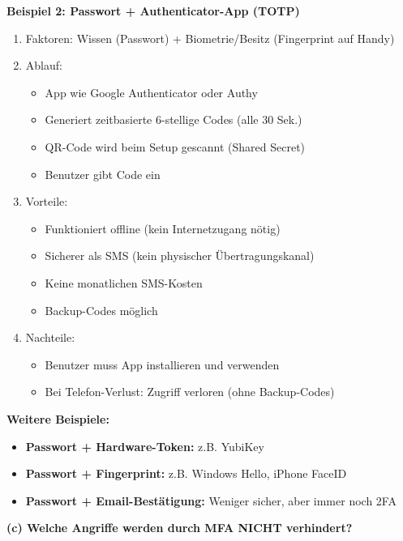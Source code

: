 \documentclass[12pt,a4paper]{article}
\begin{document}
\begin{tcolorbox}[colback=solutionbg, colframe=black!30]

\textbf{Beispiel 2: Passwort + Authenticator-App (TOTP)}
\begin{enumerate}[1.]
    \item Faktoren: Wissen (Passwort) + Biometrie/Besitz (Fingerprint auf Handy)
    \item Ablauf:
    \begin{itemize}
        \item App wie Google Authenticator oder Authy
        \item Generiert zeitbasierte 6-stellige Codes (alle 30 Sek.)
        \item QR-Code wird beim Setup gescannt (Shared Secret)
        \item Benutzer gibt Code ein
    \end{itemize}
    \item Vorteile:
    \begin{itemize}
        \item Funktioniert offline (kein Internetzugang nötig)
        \item Sicherer als SMS (kein physischer Übertragungskanal)
        \item Keine monatlichen SMS-Kosten
        \item Backup-Codes möglich
    \end{itemize}
    \item Nachteile:
    \begin{itemize}
        \item Benutzer muss App installieren und verwenden
        \item Bei Telefon-Verlust: Zugriff verloren (ohne Backup-Codes)
    \end{itemize}
\end{enumerate}

\textbf{Weitere Beispiele:}
\begin{itemize}
    \item \textbf{Passwort + Hardware-Token:} z.B. YubiKey
    \item \textbf{Passwort + Fingerprint:} z.B. Windows Hello, iPhone FaceID
    \item \textbf{Passwort + Email-Bestätigung:} Weniger sicher, aber immer noch 2FA
\end{itemize}

\textbf{(c) Welche Angriffe werden durch MFA NICHT verhindert?} \checkmark


\end{tcolorbox}
\end{document}
